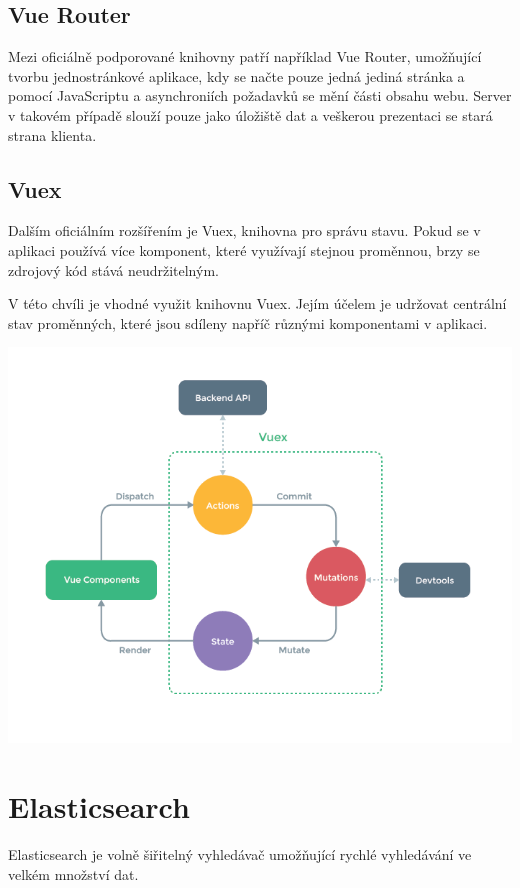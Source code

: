 \subsection{Vue Router}
Mezi oficiálně podporované knihovny patří například Vue Router, umožňující tvorbu jednostránkové aplikace, kdy se načte pouze jedná jediná stránka a pomocí JavaScriptu a asynchroniích požadavků se mění části obsahu webu. Server v takovém případě slouží pouze jako úložiště dat a veškerou prezentaci se stará strana klienta. %

\subsection{Vuex}
Dalším oficiálním rozšířením je Vuex, knihovna pro správu stavu. Pokud se v aplikaci používá více komponent, které využívají stejnou proměnnou, brzy se zdrojový kód stává neudržitelným. 

V této chvíli je vhodné využit knihovnu Vuex. Jejím účelem je udržovat centrální stav proměnných, které jsou sdíleny napříč různými komponentami v aplikaci.

\includegraphics[width=\textwidth]{images/vuex.png}

\blindtext

\section{Elasticsearch}
Elasticsearch je volně šiřitelný vyhledávač umožňující rychlé vyhledávání ve velkém množství dat. 

